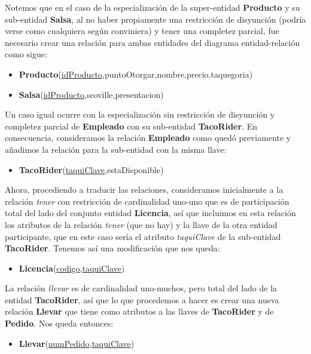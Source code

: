 \documentclass[11pt,letterpaper]{article}
\begin{document}
Notemos que en el caso de la especialización de la super-entidad \textbf{Producto} y su sub-entidad \textbf{Salsa}, al no haber propiamente una restricción de disyunción (podría verse como cualquiera según conviniera) y tener una completez parcial, fue necesario crear una relación para ambas entidades del diagrama entidad-relación como sigue:

\begin{itemize}
\item \footnotesize{\textbf{Producto}(\underline{idProducto},puntoOtorgar,nombre,precio,taquegoria)}
\item \footnotesize{\textbf{Salsa}(\underline{idProducto},scoville,presentacion)}
\end{itemize}

Un caso igual ocurre con la especialización sin restricción de disyunción y completez parcial de \textbf{Empleado} con su sub-entidad \textbf{TacoRider}. En consecuencia, consideramos la relación \textbf{Empleado} como quedó previamente y añadimos la relación para la sub-entidad con la misma llave:

\begin{itemize}
\item \footnotesize{\textbf{TacoRider}(\underline{taquiClave},estaDisponible)}
\end{itemize}

Ahora, procediendo a traducir las relaciones, consideramos inicialmente a la relación \textit{tener} con restricción de cardinalidad uno-uno que es de participación total del lado del conjunto entidad \textbf{Licencia}, así que incluimos en esta relación los atributos de la relación \textit{tener} (que no hay) y la llave de la otra entidad participante, que en este caso sería el atributo \textit{taquiClave} de la sub-entidad \textbf{TacoRider}. Tenemos así una modificación que nos queda:

\begin{itemize}
\item \footnotesize{\textbf{Licencia}(\underline{codigo},\underline{taquiClave}})
\end{itemize}

La relación \textit{llevar} es de cardinalidad uno-muchos, pero total del lado de la entidad \textbf{TacoRider}, así que lo que  procedemos a hacer es crear una nueva relación \textbf{Llevar} que tiene como atributos a las llaves de \textbf{TacoRider} y de \textbf{Pedido}. Nos queda entonces:



\begin{itemize}
\item \footnotesize{\textbf{Llevar}(\underline{numPedido},\underline{taquiClave})}
\end{itemize}
\end{document}
